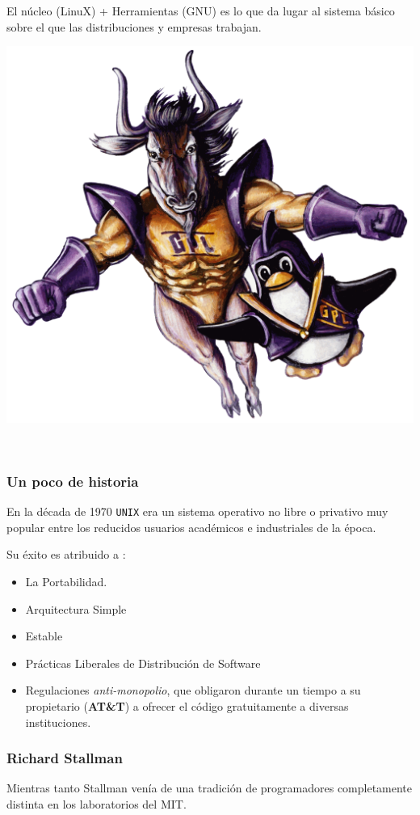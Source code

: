 \documentclass[11pt]{article}
\begin{document}
El núcleo (LinuX) + Herramientas (GNU) es lo que da lugar al sistema
básico sobre el que las distribuciones y empresas trabajan.

\begin{center}
\includegraphics[width=.9\linewidth]{Versiones/Gnu-and-penguin-color.png}
\end{center}  

\newpage
\subsubsection{Un poco de historia}
\label{sec:org768b09e}
En la década de 1970 \texttt{UNIX} era un sistema operativo no libre o
privativo muy popular entre los reducidos usuarios académicos e
industriales de la época.

Su éxito es atribuido a :

\begin{itemize}
\item La Portabilidad.
\item Arquitectura Simple
\item Estable
\item Prácticas Liberales de Distribución de Software
\item Regulaciones \emph{anti-monopolio}, que obligaron durante un tiempo a su
propietario (\textbf{AT\&T}) a ofrecer el código gratuitamente a diversas
instituciones.
\end{itemize}

\subsubsection{Richard Stallman}
\label{sec:org1900b62}
Mientras tanto Stallman venía de una tradición de programadores
completamente distinta en los laboratorios del MIT.
\end{document}
